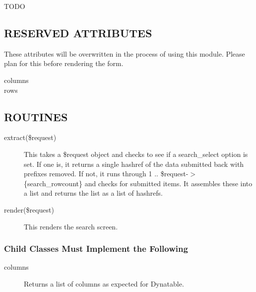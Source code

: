 \begin{description}
TODO

\subsection*{RESERVED ATTRIBUTES\label{LedgerSMB::ScriptLib::Common_Search_RESERVED_ATTRIBUTES}}


These attributes will be overwritten in the process of using this module.
Please plan for this before rendering the form.

\begin{description}

\item[{columns}] \mbox{}
\item[{rows}] \mbox{}\end{description}
\subsection*{ROUTINES\label{LedgerSMB::ScriptLib::Common_Search_ROUTINES}}
\begin{description}

\item[{extract(\$request)}] \mbox{}

This takes a \$request object and checks to see if a search\_select option is set.
If one is, it returns a single hashref of the data submitted back with prefixes
removed.  If not, it runs through 1 .. \$request-$>$\{search\_rowcount\} and checks
for submitted items.  It assembles these into a list and returns the list as a
list of hashrefs.


\item[{render(\$request)}] \mbox{}

This renders the search screen.

\end{description}
\subsubsection*{Child Classes Must Implement the Following\label{LedgerSMB::ScriptLib::Common_Search_Child_Classes_Must_Implement_the_Following}}
\begin{description}

\item[{columns}] \mbox{}

Returns a list of columns as expected for Dynatable.



\end{description}
\end{description}
